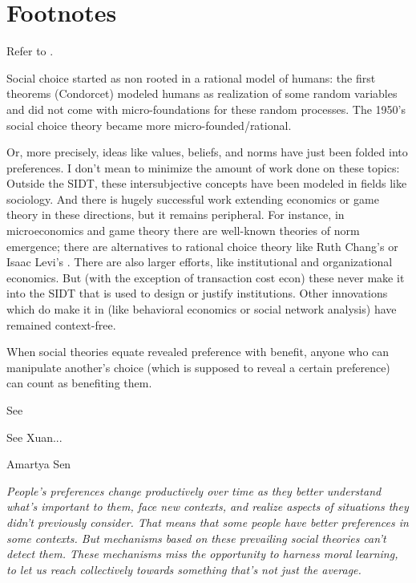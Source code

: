 \section{Footnotes}
\begin{thebibliography}{99}

 Refer to \cite{manin1997}.

 Social choice started as non rooted in a rational model of humans: the first theorems (Condorcet) modeled humans as realization of some random variables and did not come with micro-foundations for these random processes. The 1950's social choice theory became more micro-founded/rational.

 Or, more precisely, ideas like values, beliefs, and norms have just been folded into preferences. I don't mean to minimize the amount of work done on these topics: Outside the SIDT, these intersubjective concepts have been modeled in fields like sociology. And there is hugely successful work extending economics or game theory in these directions, but it remains peripheral. For instance, in microeconomics and game theory there are well-known theories of norm emergence; there are alternatives to rational choice theory like Ruth Chang's \cite{chang1997} or Isaac Levi's \cite{levi1986}. There are also larger efforts, like institutional and organizational economics. But (with the exception of transaction cost econ) these never make it into the SIDT that is used to design or justify institutions. Other innovations which do make it in (like behavioral economics or social network analysis) have remained context-free.

 When social theories equate revealed preference with benefit, anyone who can manipulate another's choice (which is supposed to reveal a certain preference) can count as benefiting them.

 See \cite{klingefjord2024}

 See Xuan...

 Amartya Sen

 \textit{People's preferences change productively over time as they better understand what's important to them, face new contexts, and realize aspects of situations they didn't previously consider. That means that some people have better preferences in some contexts. But mechanisms based on these prevailing social theories can't detect them. These mechanisms miss the opportunity to harness moral learning, to let us reach collectively towards something that's not just the average.}


\end{thebibliography}
